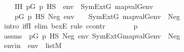 \begin{isabellebody}
\ \ \ \ IH{\isacharcolon}{\kern0pt}\ {\isachardoublequoteopen}{\isacharparenleft}{\kern0pt}{\isasymexists}p{\isasymin}G{\isachardot}{\kern0pt}\ p\ {\isasymtturnstile}HS\ {\isasymphi}\ env{\isacharparenright}{\kern0pt}\ {\isasymlongleftrightarrow}\ SymExt{\isacharparenleft}{\kern0pt}G{\isacharparenright}{\kern0pt}{\isacharcomma}{\kern0pt}\ map{\isacharparenleft}{\kern0pt}val{\isacharparenleft}{\kern0pt}G{\isacharparenright}{\kern0pt}{\isacharcomma}{\kern0pt}env{\isacharparenright}{\kern0pt}\ {\isasymTurnstile}\ {\isasymphi}{\isachardoublequoteclose}\isanewline
\ \ \isanewline
\ \ \ \ {\isachardoublequoteopen}{\isacharparenleft}{\kern0pt}{\isasymexists}p{\isasymin}G{\isachardot}{\kern0pt}\ p\ {\isasymtturnstile}HS\ Neg{\isacharparenleft}{\kern0pt}{\isasymphi}{\isacharparenright}{\kern0pt}\ env{\isacharparenright}{\kern0pt}\ \ {\isasymlongleftrightarrow}\ \ SymExt{\isacharparenleft}{\kern0pt}G{\isacharparenright}{\kern0pt}{\isacharcomma}{\kern0pt}\ map{\isacharparenleft}{\kern0pt}val{\isacharparenleft}{\kern0pt}G{\isacharparenright}{\kern0pt}{\isacharcomma}{\kern0pt}env{\isacharparenright}{\kern0pt}\ {\isasymTurnstile}\ Neg{\isacharparenleft}{\kern0pt}{\isasymphi}{\isacharparenright}{\kern0pt}{\isachardoublequoteclose}\isanewline
%
\isadelimproof
%
\endisadelimproof
%
\isatagproof
{}\isamarkupfalse%
\ {\isacharparenleft}{\kern0pt}intro\ iffI{\isacharcomma}{\kern0pt}\ elim\ bexE{\isacharcomma}{\kern0pt}\ rule\ ccontr{\isacharparenright}{\kern0pt}\ \isanewline
\ \ \isanewline
\ \ \isamarkupfalse%
\ p\ \isanewline
\ \ \isamarkupfalse%
\ assms{}\ {\isacharcolon}{\kern0pt}\ {\isachardoublequoteopen}p{\isasymin}G{\isachardoublequoteclose}\ {\isachardoublequoteopen}p\ {\isasymtturnstile}HS\ Neg{\isacharparenleft}{\kern0pt}{\isasymphi}{\isacharparenright}{\kern0pt}\ env{\isachardoublequoteclose}\ {\isachardoublequoteopen}{\isasymnot}{\isacharparenleft}{\kern0pt}SymExt{\isacharparenleft}{\kern0pt}G{\isacharparenright}{\kern0pt}{\isacharcomma}{\kern0pt}map{\isacharparenleft}{\kern0pt}val{\isacharparenleft}{\kern0pt}G{\isacharparenright}{\kern0pt}{\isacharcomma}{\kern0pt}env{\isacharparenright}{\kern0pt}\ {\isasymTurnstile}\ Neg{\isacharparenleft}{\kern0pt}{\isasymphi}{\isacharparenright}{\kern0pt}{\isacharparenright}{\kern0pt}{\isachardoublequoteclose}\isanewline
\isanewline
\ \ \isamarkupfalse%
\ envin\ {\isacharcolon}{\kern0pt}\ {\isachardoublequoteopen}env\ {\isasymin}\ list{\isacharparenleft}{\kern0pt}M{\isacharparenright}{\kern0pt}{\isachardoublequoteclose}\ \isanewline

\end{isabellebody}
